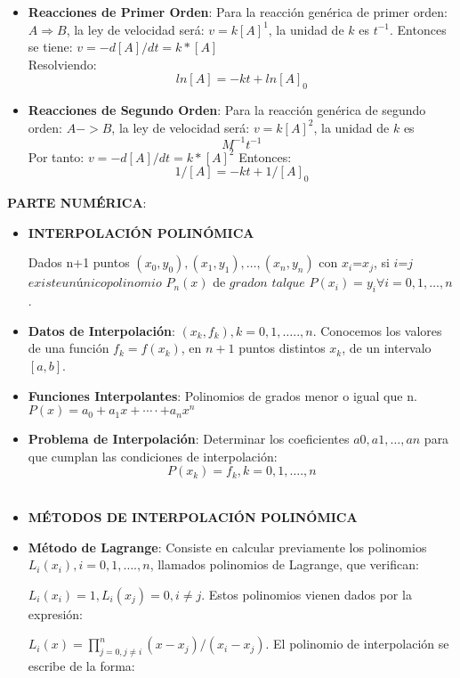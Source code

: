 \documentclass[10pt,a4paper]{article}
\begin{document}
\begin{multicols}{2}
\begin{itemize}
	\item \textbf{Reacciones de Primer Orden}: Para la reacción genérica de primer orden: $A \Rightarrow B$, la ley de velocidad será: $v=k[A]^1$, la unidad de $k$ es $t^{-1}$. Entonces se tiene:
	$v=-d[A]/dt=k*[A]$\\
	Resolviendo:   \[ln[A]=-kt+ ln[A]_0\]
	
	\item \textbf{Reacciones de Segundo Orden}: Para la reacción genérica de segundo orden: $A ->B$, la ley de velocidad será: $v=k[A]^2$, la unidad de $k$ es \[M^{-1} t^{-1}\]
	Por tanto: 
	$v=-d[A]/dt=k*[A]^2$
	Entonces: \[1/[A] =-kt+  1/[A]_0 \]


\end{itemize}
\noindent \textbf{PARTE NUMÉRICA}:	
\begin{itemize}
	\item \textbf{INTERPOLACIÓN POLINÓMICA}
	
	Dados n+1 puntos $(x_0,y_0), (x_1,y_1), … , (x_n,y_n)$ con $x_i$\not=$x_j$, si $i$\not=$j$ $ existe un único polinomio $ $P_n (x)$ de $grado $\leq$ n$ $ tal que $ $P(x_i )=y_i  \forall i=0,1,…,n$.
	\item \textbf{Datos de Interpolación}: 
	${(x_k,f_k )} $$, k=0,1,…..,n$.
	Conocemos los valores de una función $f_k=f(x_k)$, en $n+1$ puntos distintos $x_k$, de un intervalo $[a,b]$.
	
	\item \textbf{Funciones Interpolantes}: Polinomios de grados menor o igual que n.
	$P(x)=a_0+a_1 x+⋯⋅+a_n x^n$

	\item \textbf{Problema de Interpolación}: Determinar los coeficientes $a0, a1,…, an$ para que cumplan las condiciones de interpolación: \[P(x_k )= f_k,k=0,1,….,n\]\\

	\item \textbf{MÉTODOS DE INTERPOLACIÓN POLINÓMICA}

	\item \textbf{Método de Lagrange}:
	Consiste en calcular previamente los polinomios  $L_i (x_i ),i=0,1,….,n$, llamados polinomios de Lagrange, que verifican:

	$L_i (x_i )=1,L_i (x_j )=0,i\not=j$.
	Estos polinomios vienen dados por la expresión:

	$L_i (x)=\prod_{j=0,j\not=i}^{n}(x-x_j)/(x_i-x_j )$.
	El polinomio de interpolación se escribe de la forma:
	

\end{itemize}
\end{multicols}
\end{document}
